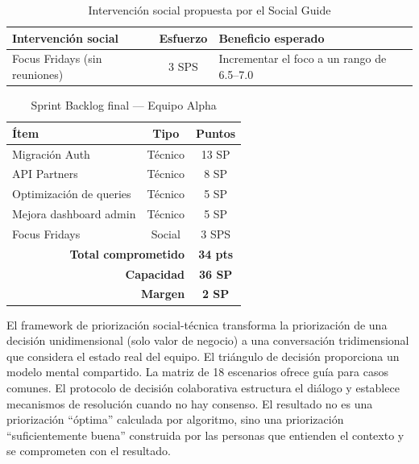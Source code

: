 \begin{table}[h]
    \centering
    \small
    \begin{tabularx}{\textwidth}{|X|c|X|}
        \hline
        \textbf{Intervención social}  & \textbf{Esfuerzo} & \textbf{Beneficio esperado}                \\
        \hline
        Focus Fridays (sin reuniones) & 3 SPS             & Incrementar el foco a un rango de 6.5--7.0 \\
        \hline
    \end{tabularx}
    \caption{Intervención social propuesta por el Social Guide}
    \label{tab:intervencion-alpha}
\end{table}
\FloatBarrier

\begin{table}[h]
    \centering
    \small
    \begin{tabularx}{\textwidth}{|X|c|c|}
        \hline
        \textbf{Ítem}                                     & \textbf{Tipo}   & \textbf{Puntos} \\
        \hline
        Migración Auth                                    & Técnico         & 13 SP           \\
        API Partners                                      & Técnico         & 8 SP            \\
        Optimización de queries                           & Técnico         & 5 SP            \\
        Mejora dashboard admin                            & Técnico         & 5 SP            \\
        Focus Fridays                                     & Social          & 3 SPS           \\
        \hline
        \multicolumn{2}{|r|}{\textbf{Total comprometido}} & \textbf{34 pts}                   \\
        \multicolumn{2}{|r|}{\textbf{Capacidad}}          & \textbf{36 SP}                    \\
        \multicolumn{2}{|r|}{\textbf{Margen}}             & \textbf{2 SP}                     \\
        \hline
    \end{tabularx}
    \caption{Sprint Backlog final — Equipo Alpha}
    \label{tab:sprint-backlog-alpha}
\end{table}
\FloatBarrier

El framework de priorización social-técnica transforma la priorización de una decisión unidimensional (solo valor de negocio) a una conversación tridimensional que considera el estado real del equipo. El triángulo de decisión proporciona un modelo mental compartido. La matriz de 18 escenarios ofrece guía para casos comunes. El protocolo de decisión colaborativa estructura el diálogo y establece mecanismos de resolución cuando no hay consenso. El resultado no es una priorización ``óptima'' calculada por algoritmo, sino una priorización ``suficientemente buena'' construida por las personas que entienden el contexto y se comprometen con el resultado.

